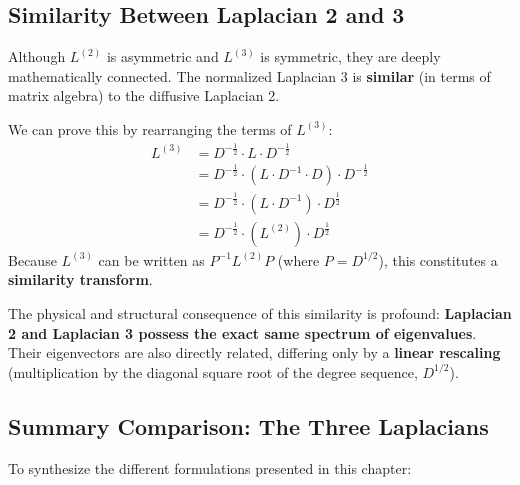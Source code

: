 \subsection{Similarity Between Laplacian 2 and 3}
Although \( L^{(2)} \) is asymmetric and \( L^{(3)} \) is symmetric, they are deeply mathematically connected. The normalized Laplacian 3 is \textbf{similar} (in terms of matrix algebra) to the diffusive Laplacian 2.

We can prove this by rearranging the terms of \( L^{(3)} \):
\[
    \begin{aligned}
        L^{(3)} & = D^{-\frac{1}{2}} \cdot L \cdot D^{-\frac{1}{2}}                        \\
                & = D^{-\frac{1}{2}} \cdot (L \cdot D^{-1} \cdot D) \cdot D^{-\frac{1}{2}} \\
                & = D^{-\frac{1}{2}} \cdot (L \cdot D^{-1}) \cdot D^{\frac{1}{2}}          \\
                & = D^{-\frac{1}{2}} \cdot \left( L^{(2)} \right) \cdot D^{\frac{1}{2}}
    \end{aligned}
\]
Because \( L^{(3)} \) can be written as \( P^{-1} L^{(2)} P \) (where \( P = D^{1/2} \)), this constitutes a \textbf{similarity transform}.

The physical and structural consequence of this similarity is profound: \textbf{Laplacian 2 and Laplacian 3 possess the exact same spectrum of eigenvalues}. Their eigenvectors are also directly related, differing only by a \textbf{linear rescaling} (multiplication by the diagonal square root of the degree sequence, \( D^{1/2} \)).

\subsection{Summary Comparison: The Three Laplacians}
To synthesize the different formulations presented in this chapter:

